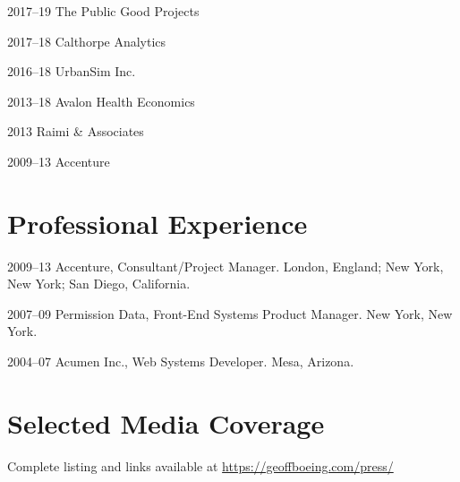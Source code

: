 \documentclass[12pt,letterpaper]{report}
\begin{document}
	\begin{tablist}

		\item[2017--19] \tab The Public Good Projects

		\item[2017--18] \tab Calthorpe Analytics

		\item[2016--18] \tab UrbanSim Inc.

		\item[2013--18] \tab Avalon Health Economics

		\item[2013]     \tab Raimi \& Associates

		\item[2009--13] \tab Accenture

	\end{tablist}



	\section*{Professional Experience}

	\begin{tablist}

		\item[2009--13] \tab Accenture, Consultant/Project Manager. London, England; New York, New York; San Diego, California.

		\item[2007--09] \tab Permission Data, Front-End Systems Product Manager. New York, New York.

		\item[2004--07] \tab Acumen Inc., Web Systems Developer. Mesa, Arizona.

	\end{tablist}



	\section*{Selected Media Coverage}

	Complete listing and links available at \href{https://geoffboeing.com/press/}{https://geoffboeing.com/press/} \bigskip
\end{document}
